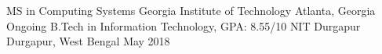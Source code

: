 
\begin{cventries}
  \cventry
  {MS in Computing Systems}
  {Georgia Institute of Technology}
  {Atlanta, Georgia}
  {Ongoing}
  {}
  \cventry
    {B.Tech in Information Technology, GPA: 8.55/10} %
    {NIT Durgapur} %
    {Durgapur, West Bengal} %
    {May 2018} %
    {}
\end{cventries}
